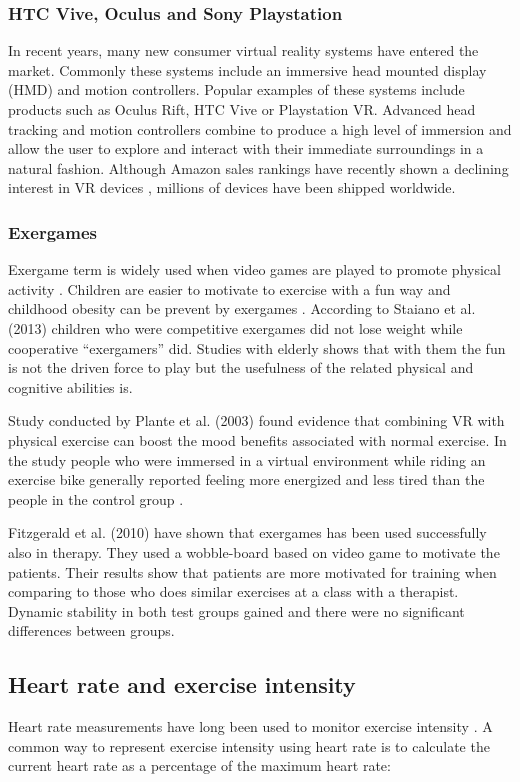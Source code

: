 \documentclass{sig-alternate-05-2015}
\begin{document}
\subsubsection{HTC Vive, Oculus and Sony Playstation}
In recent years, many new consumer virtual reality systems have entered 
the market. Commonly these systems include an immersive head mounted 
display (HMD) and motion controllers. Popular examples of these systems 
include products such as Oculus Rift, HTC Vive or Playstation VR. Advanced 
head tracking and motion controllers combine to produce a high level of 
immersion and allow the user to explore and interact with their immediate 
surroundings in a natural fashion. Although Amazon sales rankings have 
recently shown a declining interest in VR devices \cite{vr_consumer}, 
millions of devices have been shipped worldwide.

\subsubsection{Exergames}
Exergame term is widely used when video games are played to promote 
physical activity \cite{oh2010defining}. Children are easier to motivate 
to exercise with a fun way and childhood obesity can be prevent by 
exergames \cite{staiano2013adolescent}. According to Staiano et al. (2013) 
children who were competitive exergames did not lose weight while 
cooperative “exergamers” did. Studies with elderly shows that with 
them the fun is not the driven force to play but the usefulness of 
the related physical and cognitive abilities is. \cite{chen2018acceptance}

Study conducted by Plante et al. (2003) found evidence that combining 
VR with physical exercise can boost the mood benefits associated with 
normal exercise. In the study people who were immersed in a virtual 
environment while riding an exercise bike generally reported feeling 
more energized and less tired than the people in the control group 
\cite{plante2003might}. 

Fitzgerald et al. (2010) have shown that exergames has been used successfully 
also in therapy. They used a wobble-board based on video game to motivate 
the patients. Their results show that patients are more motivated for 
training when comparing to those who does similar exercises at a class 
with a therapist. Dynamic stability in both test groups gained and there 
were no significant differences between groups. \cite{fitzgerald2010effects}

\subsection{Heart rate and exercise intensity}
Heart rate measurements have long been used to monitor exercise intensity 
\cite{achten2003heart}. A common way to represent exercise intensity 
using heart rate is to calculate the current heart rate as a percentage 
of the maximum heart rate: 
\end{document}
